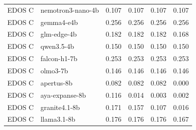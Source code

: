 \begin{table}[t]
\begin{tabular}{llrrrr}
EDOS C & nemotron3-nano-4b & 0.107 & 0.107 & 0.107 & 0.107 \\
EDOS C & gemma4-e4b & 0.256 & 0.256 & 0.256 & 0.256 \\
EDOS C & glm-edge-4b & 0.182 & 0.182 & 0.182 & 0.168 \\
EDOS C & qwen3.5-4b & 0.150 & 0.150 & 0.150 & 0.150 \\
EDOS C & falcon-h1-7b & 0.253 & 0.253 & 0.253 & 0.253 \\
EDOS C & olmo3-7b & 0.146 & 0.146 & 0.146 & 0.146 \\
EDOS C & apertus-8b & 0.082 & 0.082 & 0.082 & 0.000 \\
EDOS C & aya-expanse-8b & 0.116 & 0.014 & 0.003 & 0.002 \\
EDOS C & granite4.1-8b & 0.171 & 0.157 & 0.107 & 0.016 \\
EDOS C & llama3.1-8b & 0.176 & 0.176 & 0.176 & 0.167 \\
\bottomrule
\end{tabular}
\end{table}
